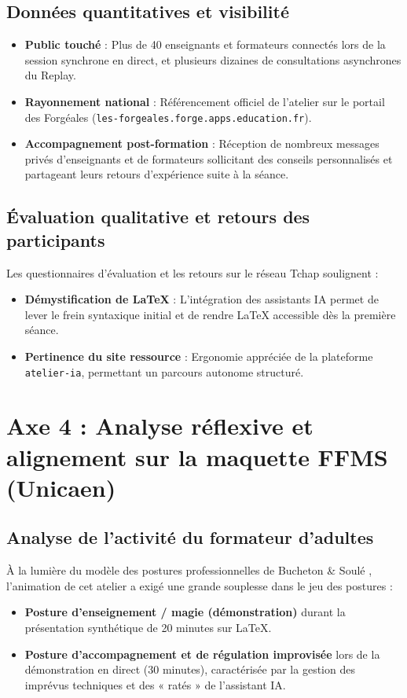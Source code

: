 \subsection{Données quantitatives et visibilité}

\begin{itemize}[leftmargin=*]
    \item \textbf{Public touché} : Plus de 40 enseignants et formateurs connectés lors de la session synchrone en direct, et plusieurs dizaines de consultations asynchrones du Replay.
    \item \textbf{Rayonnement national} : Référencement officiel de l'atelier sur le portail des Forgéales (\texttt{les-forgeales.forge.apps.education.fr}).
    \item \textbf{Accompagnement post-formation} : Réception de nombreux messages privés d'enseignants et de formateurs sollicitant des conseils personnalisés et partageant leurs retours d'expérience suite à la séance.
\end{itemize}

\subsection{Évaluation qualitative et retours des participants}

Les questionnaires d'évaluation et les retours sur le réseau Tchap soulignent :
\begin{itemize}[leftmargin=*]
    \item \textbf{Démystification de \LaTeX{}} : L'intégration des assistants IA permet de lever le frein syntaxique initial et de rendre \LaTeX{} accessible dès la première séance.
    \item \textbf{Pertinence du site ressource} : Ergonomie appréciée de la plateforme \texttt{atelier-ia}, permettant un parcours autonome structuré.
\end{itemize}

\section{Axe 4 : Analyse réflexive et alignement sur la maquette FFMS (Unicaen)}

\subsection{Analyse de l'activité du formateur d'adultes}

À la lumière du modèle des postures professionnelles de Bucheton \& Soulé \parencite{bucheton_postures}, l'animation de cet atelier a exigé une grande souplesse dans le jeu des postures :
\begin{itemize}[leftmargin=*]
    \item \textbf{Posture d'enseignement / magie (démonstration)} durant la présentation synthétique de 20 minutes sur \LaTeX{}.
    \item \textbf{Posture d'accompagnement et de régulation improvisée} lors de la démonstration en direct (30 minutes), caractérisée par la gestion des imprévus techniques et des « ratés » de l'assistant IA.
\end{itemize}


